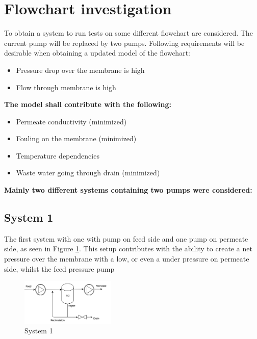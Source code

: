 
\section{Flowchart investigation}
\label{Flowchart}
To obtain a system to run tests on some different flowchart are considered. The current pump will be replaced by two pumps. Following requirements will be desirable when obtaining a updated model of the flowchart:



\begin{itemize}
\renewcommand\labelitemi{ }
\item Pressure drop over the membrane is high
\item Flow through membrane is high
\end{itemize}
\textbf{The model shall contribute with the following:}
\begin{itemize}
\renewcommand\labelitemi{ }
\item Permeate conductivity (minimized)
\item Fouling on the membrane (minimized)
\item Temperature dependencies 
\item Waste water going through drain (minimized)
\end{itemize}

\textbf{Mainly two different systems containing two pumps were considered:}

\subsection{System 1}
The first system with one with pump on feed side and one pump on permeate side, as seen in Figure \ref{fig:FlowCInves1}. This setup contributes with the ability to create a net pressure over the membrane with a low, or even a under pressure on permeate side, whilst the feed pressure pump

\begin{figure}[h]
    \centering
    \includegraphics[width=0.4\textwidth]{FlowCInves1}
    \caption{System 1}
    \label{fig:FlowCInves1}
\end{figure}

